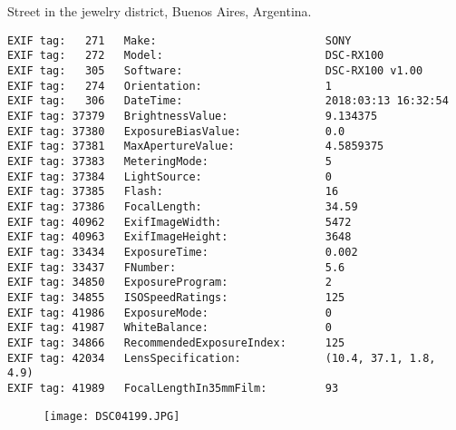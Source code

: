 \clearpage
\section{\protect{}}
\noindent Street in the jewelry district, Buenos Aires, Argentina.
\noindent
\begin{lstlisting}
EXIF tag:   271   Make:                          SONY
EXIF tag:   272   Model:                         DSC-RX100
EXIF tag:   305   Software:                      DSC-RX100 v1.00
EXIF tag:   274   Orientation:                   1
EXIF tag:   306   DateTime:                      2018:03:13 16:32:54
EXIF tag: 37379   BrightnessValue:               9.134375
EXIF tag: 37380   ExposureBiasValue:             0.0
EXIF tag: 37381   MaxApertureValue:              4.5859375
EXIF tag: 37383   MeteringMode:                  5
EXIF tag: 37384   LightSource:                   0
EXIF tag: 37385   Flash:                         16
EXIF tag: 37386   FocalLength:                   34.59
EXIF tag: 40962   ExifImageWidth:                5472
EXIF tag: 40963   ExifImageHeight:               3648
EXIF tag: 33434   ExposureTime:                  0.002
EXIF tag: 33437   FNumber:                       5.6
EXIF tag: 34850   ExposureProgram:               2
EXIF tag: 34855   ISOSpeedRatings:               125
EXIF tag: 41986   ExposureMode:                  0
EXIF tag: 41987   WhiteBalance:                  0
EXIF tag: 34866   RecommendedExposureIndex:      125
EXIF tag: 42034   LensSpecification:             (10.4, 37.1, 1.8, 4.9)
EXIF tag: 41989   FocalLengthIn35mmFilm:         93

\end{lstlisting}
\clearpage
\begin{figure}
\raggedleft
\texttt{[image: DSC04199.JPG]}
\end{figure}


\clearpage
